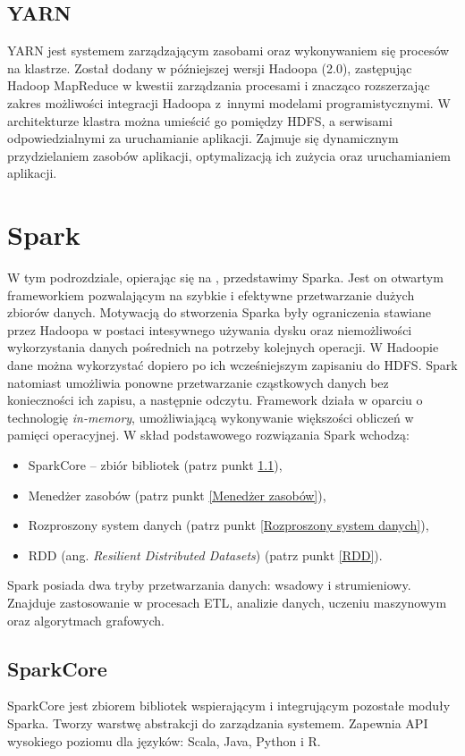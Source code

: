 \documentclass[magisterska]{pracamgr}
\begin{document}
\subsection{YARN} \label{YARN}

YARN jest systemem zarządzającym zasobami oraz wykonywaniem się procesów na klastrze. Został dodany w późniejszej wersji Hadoopa (2.0), zastępując Hadoop MapReduce w kwestii zarządzania procesami i znacząco rozszerzając zakres możliwości integracji Hadoopa z~innymi modelami programistycznymi. W architekturze klastra można umieścić go pomiędzy HDFS, a serwisami odpowiedzialnymi za uruchamianie aplikacji. Zajmuje się dynamicznym przydzielaniem zasobów aplikacji, optymalizacją ich zużycia oraz uruchamianiem aplikacji.

\section{Spark}

W tym podrozdziale, opierając się na \cite{zaharia2010spark}, przedstawimy Sparka. Jest on otwartym frameworkiem pozwalającym na szybkie i efektywne przetwarzanie dużych zbiorów danych. Motywacją do stworzenia Sparka były ograniczenia stawiane przez Hadoopa w postaci intesywnego używania dysku oraz niemożliwości wykorzystania danych pośrednich na potrzeby kolejnych operacji. W Hadoopie dane można wykorzystać dopiero po ich wcześniejszym zapisaniu do HDFS. Spark natomiast umożliwia ponowne przetwarzanie cząstkowych danych bez konieczności ich zapisu, a następnie odczytu. Framework działa w oparciu o technologię \textit{in-memory}, umożliwiającą wykonywanie większości obliczeń w pamięci operacyjnej. W skład podstawowego rozwiązania Spark wchodzą:
\begin{itemize}
    \item SparkCore -- zbiór bibliotek (patrz punkt \ref{SparkCore}),
    \item Menedżer zasobów (patrz punkt \ref{Menedżer zasobów}),
    \item Rozproszony system danych (patrz punkt \ref{Rozproszony system danych}),
    \item RDD (ang. \textit{Resilient Distributed Datasets}) (patrz punkt \ref{RDD}).
\end{itemize}

Spark posiada dwa tryby przetwarzania danych: wsadowy i strumieniowy. Znajduje zastosowanie w procesach ETL, analizie danych, uczeniu maszynowym oraz algorytmach grafowych.


\subsection{SparkCore} \label{SparkCore}
SparkCore jest zbiorem bibliotek wspierającym i integrującym pozostałe moduły Sparka. Tworzy warstwę abstrakcji do zarządzania systemem. Zapewnia API wysokiego poziomu dla języków: Scala, Java, Python i R.
\end{document}
